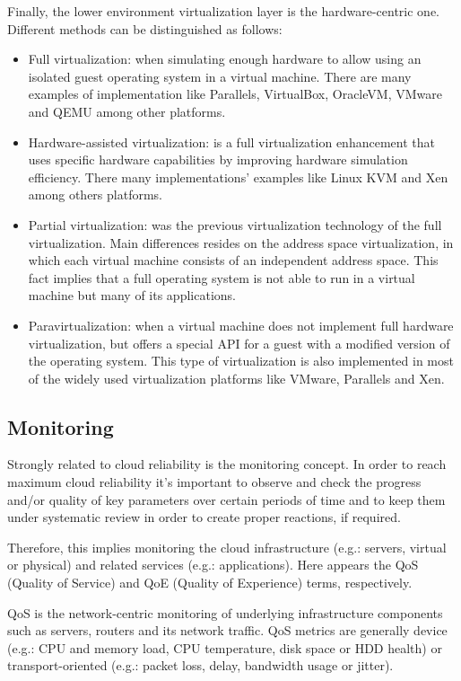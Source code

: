 Finally, the lower environment virtualization layer is the hardware-centric one. Different methods can be distinguished as follows:

\begin{itemize}
\item Full virtualization: when simulating enough hardware to allow using an isolated guest operating system in a virtual machine. There are many examples of implementation like Parallels, VirtualBox, OracleVM, VMware and QEMU among other platforms.
\item Hardware-assisted virtualization: is a full virtualization enhancement that uses specific hardware capabilities by improving hardware simulation efficiency. There many implementations' examples like Linux KVM and Xen among others platforms. 
\item Partial virtualization: was the previous virtualization technology of the full virtualization. Main differences resides on the address space virtualization, in which each virtual machine consists of an independent address space. This fact implies that a full operating system is not able to run in a virtual machine but many of its applications. 
\item Paravirtualization: when a virtual machine does not implement full hardware virtualization, but offers a special API for a guest with a modified version of the operating system. This type of virtualization is also implemented in most of the widely used virtualization platforms like VMware, Parallels and Xen.
\end{itemize}

\subsection{Monitoring}\label{SOA:monitoring}

Strongly related to cloud reliability is the monitoring concept. In order to reach maximum cloud reliability it's important to observe and check the progress and/or quality of key parameters over certain periods of time and to keep them under systematic review in order to create proper reactions, if required.

Therefore, this implies monitoring the cloud infrastructure (e.g.: servers, virtual or physical) and related services (e.g.: applications). Here appears the QoS (Quality of Service) and QoE (Quality of Experience) terms, respectively.

QoS is the network-centric monitoring of underlying infrastructure components such as servers, routers and its network traffic. QoS metrics are generally device (e.g.: CPU and memory load, CPU temperature, disk space or HDD health) or transport-oriented (e.g.: packet loss, delay, bandwidth usage or jitter). 

